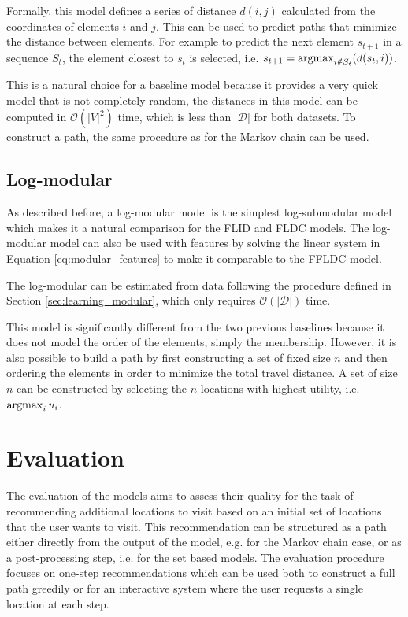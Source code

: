 Formally, this model defines a series of distance $d(i,j)$ calculated from the coordinates of elements $i$ and $j$. This can be used to predict paths that minimize the distance between elements. For example to predict the next element $s_{t+1}$ in a sequence $S_{t}$, the element closest to $s_{t}$ is selected, i.e. $s_{t+1} = \operatorname*{argmax}_{i \notin S_{t}}(d(s_{t}, i))$.

This is a natural choice for a baseline model because it provides a very quick model that is not completely random, the distances in this model can be computed in $\mathcal{O}(|V|^{2})$ time, which is less than $|\mathcal{D}|$ for both datasets. To construct a path, the same procedure as for the Markov chain can be used.

\subsection{Log-modular}

As described before, a log-modular model is the simplest log-submodular model which makes it a natural comparison for the FLID and FLDC models. The log-modular model can also be used with features by solving the linear system in Equation \eqref{eq:modular_features} to make it comparable to the FFLDC model.

The log-modular can be estimated from data following the procedure defined in Section \ref{sec:learning_modular}, which only requires $\mathcal{O}(|\mathcal{D}|)$ time.

This model is significantly different from the two previous baselines because it does not model the order of the elements, simply the membership. However, it is also possible to build a path by first constructing a set of fixed size $n$ and then ordering the elements in order to minimize the total travel distance. A set of size $n$ can be constructed by selecting the $n$ locations with highest utility, i.e. $\operatorname*{argmax}_{i} u_{i}$.

\section{Evaluation}
\label{sec:evaluation}

The evaluation of the models aims to assess their quality for the task of recommending additional locations to visit based on an initial set of locations that the user wants to visit. This recommendation can be structured as a path either directly from the output of the model, e.g. for the Markov chain case, or as a post-processing step, i.e. for the set based models. The evaluation procedure focuses on one-step recommendations which can be used both to construct a full path greedily or for an interactive system where the user requests a single location at each step.

